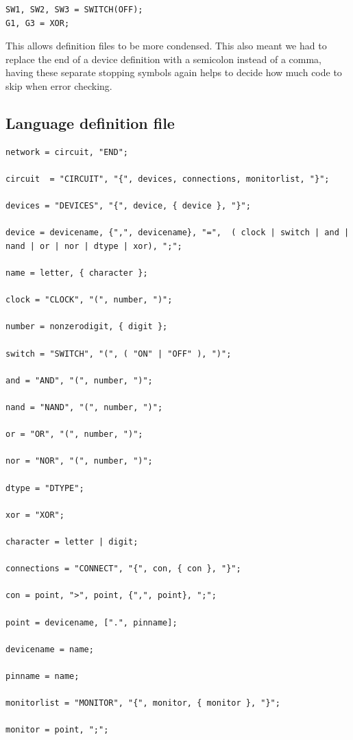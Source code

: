 \documentclass[10pt]{article}
\begin{document}
\begin{verbatim}
SW1, SW2, SW3 = SWITCH(OFF);
G1, G3 = XOR;
\end{verbatim}

This allows definition files to be more condensed. This also meant we had to replace the end of a device definition with a semicolon instead of a comma, having these separate stopping symbols again helps to decide how much code to skip when error checking. \\

\newpage
\subsection{Language definition file}

\begin{verbatim}
network = circuit, "END";

circuit  = "CIRCUIT", "{", devices, connections, monitorlist, "}";

devices = "DEVICES", "{", device, { device }, "}";

device = devicename, {",", devicename}, "=",  ( clock | switch | and | nand | or | nor | dtype | xor), ";";

name = letter, { character };

clock = "CLOCK", "(", number, ")";

number = nonzerodigit, { digit };

switch = "SWITCH", "(", ( "ON" | "OFF" ), ")";

and = "AND", "(", number, ")";

nand = "NAND", "(", number, ")";

or = "OR", "(", number, ")";

nor = "NOR", "(", number, ")";

dtype = "DTYPE";

xor = "XOR";

character = letter | digit;

connections = "CONNECT", "{", con, { con }, "}";

con = point, ">", point, {",", point}, ";";

point = devicename, [".", pinname];

devicename = name;

pinname = name;

monitorlist = "MONITOR", "{", monitor, { monitor }, "}";

monitor = point, ";";
\end{verbatim}
\end{document}
